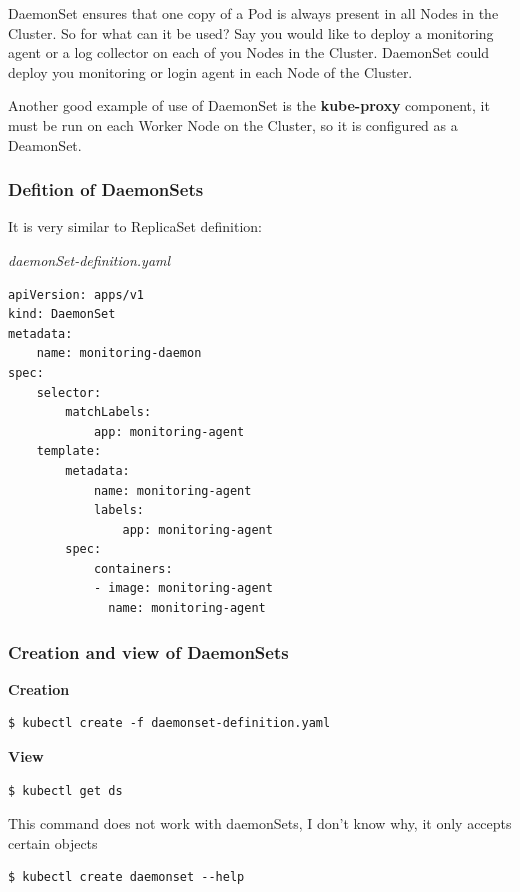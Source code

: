 \documentclass{article}
\newenvironment{blocktemplateIII}[1]{%
    \tcolorbox[beamer,%
    noparskip,breakable,
    ,colframe=Red,%
    colbacklower=LimeGreen!75!LightGreen,%
    title=#1]}%
    {\endtcolorbox}
\newenvironment{codetemplate}[1][]{%
  \mybasecolorbox[#1]
  \itshape
}{%
  \endmybasecolorbox
}
\begin{document}
DaemonSet ensures that one copy of a Pod is always present in all Nodes in the Cluster. So for what can it be used? Say you would like to deploy a monitoring agent or a log collector on each of you Nodes in the Cluster. DaemonSet could deploy you monitoring or login agent in each Node of the Cluster.

Another good example of use of DaemonSet is the \textbf{kube-proxy} component, it must be run on each Worker Node on the Cluster, so it is configured as a DeamonSet.

\subsubsection{Defition of DaemonSets}

It is very similar to ReplicaSet definition:

\begin{codetemplate}{daemonSet-definition.yaml}
\begin{verbatim}
apiVersion: apps/v1
kind: DaemonSet
metadata:
    name: monitoring-daemon
spec:
    selector:
        matchLabels:
            app: monitoring-agent
    template:
        metadata:
            name: monitoring-agent
            labels:
                app: monitoring-agent
        spec:
            containers:
            - image: monitoring-agent
              name: monitoring-agent
\end{verbatim}
\end{codetemplate}

\subsubsection{Creation and view of DaemonSets}

\textbf{Creation}
\begin{codetemplate}{}
\begin{verbatim}
$ kubectl create -f daemonset-definition.yaml
\end{verbatim}
\end{codetemplate}

\textbf{View}
\begin{codetemplate}{}
\begin{verbatim}
$ kubectl get ds
\end{verbatim}
\end{codetemplate}

\begin{blocktemplateIII}{WARNING}
This command does not work with daemonSets, I don't know why, it only accepts certain objects
\begin{codetemplate}{}
\begin{verbatim}
$ kubectl create daemonset --help
\end{verbatim}
\end{codetemplate}
\end{blocktemplateIII}
\end{document}
